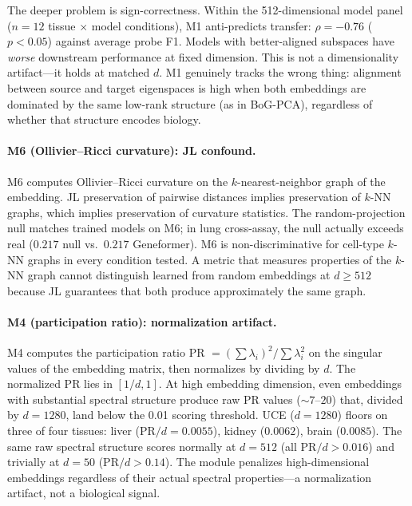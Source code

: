 \documentclass[9pt,lineno]{elife}
\begin{document}
The deeper problem is sign-correctness. Within the 512-dimensional model panel ($n = 12$ tissue $\times$ model conditions), M1 anti-predicts transfer: $\rho = -0.76$ ($p < 0.05$) against average probe F1. Models with better-aligned subspaces have \emph{worse} downstream performance at fixed dimension. This is not a dimensionality artifact---it holds at matched $d$. M1 genuinely tracks the wrong thing: alignment between source and target eigenspaces is high when both embeddings are dominated by the same low-rank structure (as in BoG-PCA), regardless of whether that structure encodes biology.

\paragraph{M6 (Ollivier--Ricci curvature): JL confound.}

M6 computes Ollivier--Ricci curvature on the $k$-nearest-neighbor graph of the embedding. JL preservation of pairwise distances implies preservation of $k$-NN graphs, which implies preservation of curvature statistics. The random-projection null matches trained models on M6; in lung cross-assay, the null actually exceeds real ($0.217$ null vs.\ $0.217$ Geneformer). M6 is non-discriminative for cell-type $k$-NN graphs in every condition tested. A metric that measures properties of the $k$-NN graph cannot distinguish learned from random embeddings at $d \geq 512$ because JL guarantees that both produce approximately the same graph.

\paragraph{M4 (participation ratio): normalization artifact.}
\label{sec:m4}

M4 computes the participation ratio PR $= (\sum \lambda_i)^2 / \sum \lambda_i^2$ on the singular values of the embedding matrix, then normalizes by dividing by $d$. The normalized PR lies in $[1/d, 1]$. At high embedding dimension, even embeddings with substantial spectral structure produce raw PR values ($\sim 7$--$20$) that, divided by $d = 1280$, land below the 0.01 scoring threshold. UCE ($d = 1280$) floors on three of four tissues: liver (PR$/d = 0.0055$), kidney ($0.0062$), brain ($0.0085$). The same raw spectral structure scores normally at $d = 512$ (all PR$/d > 0.016$) and trivially at $d = 50$ (PR$/d > 0.14$). The module penalizes high-dimensional embeddings regardless of their actual spectral properties---a normalization artifact, not a biological signal.
\end{document}
